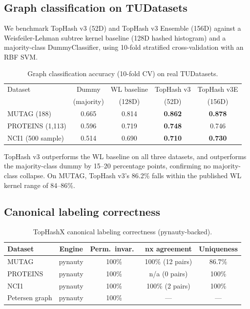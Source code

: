 \documentclass[11pt]{article}
\begin{document}
\subsection{Graph classification on TUDatasets}

We benchmark TopHash v3 (52D) and TopHash v3 Ensemble (156D) against a Weisfeiler-Lehman subtree kernel baseline (128D hashed histogram) and a majority-class DummyClassifier, using 10-fold stratified cross-validation with an RBF SVM.

\begin{table}[h]
\centering
\caption{Graph classification accuracy (10-fold CV) on real TUDatasets.}
\label{tab:classification}
\begin{tabular}{lcccc}
\toprule
Dataset & Dummy & WL baseline & TopHash v3 & TopHash v3E \\
& (majority) & (128D) & (52D) & (156D) \\
\midrule
MUTAG (188) & 0.665 & 0.814 & \textbf{0.862} & \textbf{0.878} \\
PROTEINS (1,113) & 0.596 & 0.719 & \textbf{0.748} & 0.746 \\
NCI1 (500 sample) & 0.514 & 0.690 & \textbf{0.710} & \textbf{0.730} \\
\bottomrule
\end{tabular}
\end{table}

TopHash v3 outperforms the WL baseline on all three datasets, and outperforms the majority-class dummy by 15--20 percentage points, confirming no majority-class collapse. On MUTAG, TopHash v3's 86.2\% falls within the published WL kernel range of 84--86\%.

\subsection{Canonical labeling correctness}

\begin{table}[h]
\centering
\caption{TopHashX canonical labeling correctness (pynauty-backed).}
\label{tab:canon}
\begin{tabular}{lcccc}
\toprule
Dataset & Engine & Perm.\ invar.\ & nx agreement & Uniqueness \\
\midrule
MUTAG & pynauty & 100\% & 100\% (12 pairs) & 86.7\% \\
PROTEINS & pynauty & 100\% & n/a (0 pairs) & 100\% \\
NCI1 & pynauty & 100\% & 100\% (2 pairs) & 100\% \\
Petersen graph & pynauty & 100\% & --- & --- \\
\bottomrule
\end{tabular}
\end{table}
\end{document}
